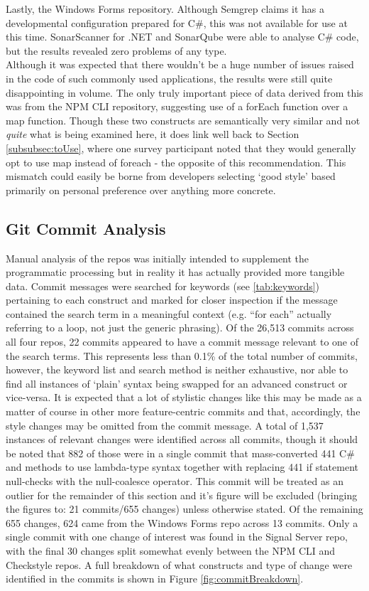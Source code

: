 \documentclass{article}
\begin{document}
            Lastly, the Windows Forms repository. Although Semgrep claims it has a developmental configuration prepared for C\#, this was not available for use at this time. SonarScanner for .NET and SonarQube were able to analyse C\# code, but the results revealed zero problems of any type.
            \\
            Although it was expected that there wouldn't be a huge number of issues raised in the code of such commonly used applications, the results were still quite disappointing in volume. The only truly important piece of data derived from this was from the NPM CLI repository, suggesting use of a forEach function over a map function. Though these two constructs are semantically very similar and not \emph{quite} what is being examined here, it does link well back to Section \ref{subsubsec:toUse}, where one survey participant noted that they would generally opt to use map instead of foreach - the opposite of this recommendation. This mismatch could easily be borne from developers selecting `good style' based primarily on personal preference over anything more concrete.
    \subsection{Git Commit Analysis}
        Manual analysis of the repos was initially intended to supplement the programmatic processing but in reality it has actually provided more tangible data. Commit messages were searched for keywords (see \ref{tab:keywords}) pertaining to each construct and marked for closer inspection if the message contained the search term in a meaningful context (e.g. ``for each'' actually referring to a loop, not just the generic phrasing). Of the 26,513 commits across all four repos, 22 commits appeared to have a commit message relevant to one of the search terms. This represents less than 0.1\% of the total number of commits, however, the keyword list and search method is neither exhaustive, nor able to find all instances of `plain' syntax being swapped for an advanced construct or vice-versa. It is expected that a lot of stylistic changes like this may be made as a matter of course in other more feature-centric commits and that, accordingly, the style changes may be omitted from the commit message. A total of 1,537 instances of relevant changes were identified across all commits, though it should be noted that 882 of those were in a single commit that mass-converted 441 C\#  and  methods to use lambda-type syntax together with replacing 441 if statement null-checks with the null-coalesce operator. This commit will be treated as an outlier for the remainder of this section and it's figure will be excluded (bringing the figures to: 21 commits/655 changes) unless otherwise stated. Of the remaining 655 changes, 624 came from the Windows Forms repo across 13 commits. Only a single commit with one change of interest was found in the Signal Server repo, with the final 30 changes split somewhat evenly between the NPM CLI and Checkstyle repos. A full breakdown of what constructs and type of change were identified in the commits is shown in Figure \ref{fig:commitBreakdown}.
\end{document}
